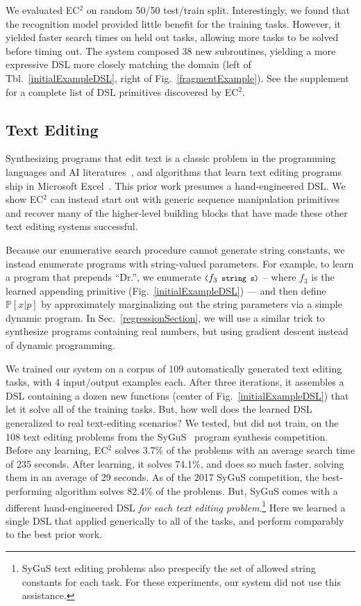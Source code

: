 \documentclass{article}
\newcommand{\system}{\textsc{EC$^2$} }
\newcommand{\systemEnding}{\textsc{EC$^2$}}
\newcommand{\code}[1]{{\footnotesize\texttt{#1}}}
\newcommand{\probability}{\mathds{P}} %
\begin{document}
We evaluated \system on  random 50/50 test/train split.
Interestingly, we found that the recognition model provided little benefit for the training
tasks. However, it yielded faster search times on held out tasks, allowing
more tasks to be solved before timing out.
The system composed 38 new subroutines, yielding a more expressive DSL more closely matching the
domain (left of Tbl.~\ref{initialExampleDSL}, right of
Fig.~\ref{fragmentExample}). See the supplement for a complete list of
DSL primitives discovered by \systemEnding.

\subsection{Text Editing}\label{textSection}
Synthesizing programs that edit text is a classic problem in the
programming languages and AI literatures~\cite{menon2013machine,lau2001programming},
and algorithms that learn text editing programs ship in Microsoft Excel~\cite{gulwani2011automating}.
This prior work presumes a hand-engineered DSL.
We show \system can instead start out with generic sequence manipulation
primitives and recover many of the higher-level building blocks that have
made these other text editing systems successful.

Because our enumerative search procedure cannot generate string
constants, we instead enumerate programs with string-valued
parameters.  For example, to learn a program that prepends ``Dr.'', we
enumerate $\text{\code{(}}f_3\code{ string s)}$ -- where $f_3$ is the
learned appending primitive (Fig.~\ref{initialExampleDSL}) --- and then
define $\probability[x|p]$ by approximately marginalizing out the
string parameters via a simple dynamic program.
In Sec.~\ref{regressionSection}, we will use a similar trick to
synthesize programs containing real numbers, but using gradient
descent instead of dynamic programming.

We trained our system on a corpus of 109 automatically generated text editing tasks, with 4 input/output examples each.
After three iterations, it assembles a DSL containing a dozen new functions (center of Fig.~\ref{initialExampleDSL}) that let it solve 
all of the training tasks.
But, how well does the  learned DSL generalized to real text-editing scenarios?
We tested, but did not train, on the 108 text editing problems from the SyGuS~\cite{alur2016sygus} program synthesis competition. Before any learning,
\system solves 3.7\% of the problems with an average search time of 235 seconds.
After learning,
it solves 74.1\%, and does so much faster,
solving them in an average of 29 seconds.
As of the 2017 SyGuS competition,
the best-performing algorithm solves 82.4\% of the problems.
But, SyGuS comes with a
different hand-engineered DSL \emph{for each text editing problem}.\footnote{SyGuS text editing problems also prespecify the set of allowed string constants for each task. For these experiments, our system did not use this assistance.}
Here  we learned a single DSL
that applied generically to
all of the tasks,
and perform comparably to the best
prior work.
\end{document}
